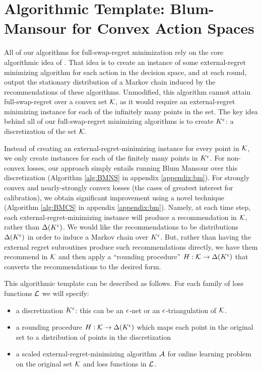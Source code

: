 \documentclass[final,12pt]{alt2025}
\begin{document}
\section{Algorithmic Template: Blum-Mansour for Convex Action Spaces}

All of our algorithms for full-swap-regret minimization rely on the core algorithmic idea of \cite{blum2007external}.  That idea is to create an instance of some external-regret minimizing algorithm for each action in the decision space, and at each round, output the stationary distribution of a Markov chain induced by the recommendations of these algorithms.  Unmodified, this algorithm cannot attain full-swap-regret over a convex set $\mathcal{K}$, as it would require an external-regret minimizing instance for each of the infinitely many points in the set.  The key idea behind all of our full-swap-regret minimizing algorithms is to create $K^{\epsilon}$: a discretization of the set $\mathcal{K}$.

Instead of creating an external-regret-minimizing instance for every point in $\mathcal{K}$, we only create instances for each of the finitely many points in $K^{\epsilon}$.  For non-convex losses, our approach simply entails running Blum Mansour over this discretization (Algorithm \ref{alg:BMNS} in appendix \ref{appendix:bm}).  For strongly convex and nearly-strongly convex losses (the cases of greatest interest for calibration), we obtain significant improvement using a novel technique (Algorithm \ref{alg:BMCS} in appendix \ref{appendix:bm}).  Namely, at each time step, each external-regret-minimizing instance will produce a recommendation in $\mathcal{K}$, rather than $\Delta(K^{\epsilon})$.  We would like the recommendations to be distributions $\Delta(K^{\epsilon})$ in order to induce a Markov chain over $K^{\epsilon}$.  But, rather than having the external regret subroutines produce such recommendations directly, we have them recommend in $\mathcal{K}$ and then apply a ``rounding procedure'' $H: \mathcal{K} \to \Delta(K^{\epsilon})$ that converts the recommendations to the desired form.  












This algorithmic template can be described as follows. For each family of loss functions $\mathcal{L}$ we will specify:
\begin{itemize}
\item a discretization $K^{\epsilon}$: this can be an $\epsilon$-net or an $\epsilon$-triangulation of $\mathcal{K}$.
\item a rounding procedure $H: \mathcal{K} \to \Delta(K^{\epsilon})$ which maps each point in the original set to a distribution of points in the discretization
\item a scaled external-regret-minimizing algorithm $\mathcal{A}$ for online learning problem on the original set $\mathcal{K}$ and loss functions in $\mathcal{L}$.
\end{itemize}
\end{document}
